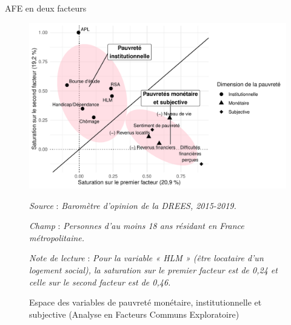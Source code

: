\documentclass[10pt,xcolor=table,color={dvipsnames,usenames},ignorenonframetext,usepdftitle=false,french]{beamer}
\begin{document}
\begin{frame}{AFE en deux facteurs}
\protect\hypertarget{afe-en-deux-facteurs}{}
\begin{figure}[!ht]

{\centering \includegraphics[width=1\linewidth]{M2_ANTUNEZ_SQD_ORAL_files/figure-beamer/afe-1} 

}

\caption[Espace des variables de pauvreté monétaire, institutionnelle et subjective (Analyse en Facteurs Communs Exploratoire)]{Espace des variables de pauvreté monétaire, institutionnelle et subjective (Analyse en Facteurs Communs Exploratoire)}\label{fig:afe}

\footnotesize


\emph{Source} : \emph{Baromètre d’opinion de la DREES, 2015-2019.}


\emph{Champ} : \emph{Personnes d’au moins 18 ans résidant en France métropolitaine.}


\emph{Note de lecture} : \emph{Pour la variable « HLM » (être locataire d’un logement social), la saturation sur le premier facteur est de 0,24 et celle sur le second facteur est de 0,46.}
\normalsize\end{figure}
\end{frame}
\end{document}
